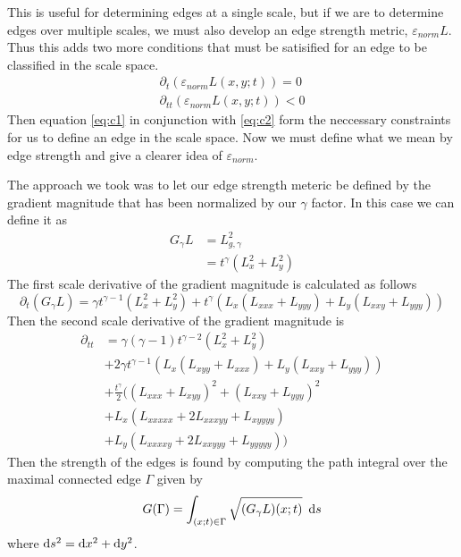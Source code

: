 \documentclass{article}
\begin{document}
This is useful for determining edges at a single scale, but if we are to determine edges over multiple scales, we must also develop an edge strength metric, $\varepsilon_{norm}L$.
Thus this adds two more conditions that must be satisified for an edge to be classified in the scale space. 
\begin{equation} \label{eq:c2}
  \begin{aligned}
    \partial_t(\varepsilon_{norm}L(x,y;t)) = 0\\
    \partial_{tt}(\varepsilon_{norm}L(x,y;t)) < 0
  \end{aligned}
\end{equation}
Then equation \ref{eq:c1} in conjunction with \ref{eq:c2} form the neccessary constraints for us to define an edge in the scale space.
Now we must define what we mean by edge strength and give a clearer idea of $\varepsilon_{norm}$.

The approach we took was to let our edge strength meteric be defined by the gradient magnitude that has been normalized by our $\gamma$ factor.
In this case we can define it as 
\begin{align}
  G_{\gamma}L &= L_{g,\gamma}^2 \\
  &= t^{\gamma}(L_x^2+L_y^2)
\end{align}
The first scale derivative of the gradient magnitude is calculated as follows
\begin{equation}
  \partial_t (G_{\gamma}L) = \gamma t^{\gamma-1}(L_x^2+L_y^2) + t^{\gamma}(L_x(L_{xxx}+L_{yyy})+L_y(L_{xxy} + L_{yyy}))
\end{equation}
Then the second scale derivative of the gradient magnitude is
\begin{equation}
  \begin{aligned}
    \partial_{tt} &= \gamma(\gamma-1)t^{\gamma-2}(L_x^2+L_y^2) \\
     &+ 2\gamma t^{\gamma-1}(L_x(L_{xyy}+L_{xxx})+L_y(L_{xxy}+L_{yyy})) \\
     &+\frac{t^{\gamma}}{2}\big((L_{xxx}+L_{xyy})^2+(L_{xxy}+L_{yyy})^2 \\
     &+ L_x(L_{xxxxx}+2L_{xxxyy}+L_{xyyyy}) \\
     &+L_y(L_{xxxxy}+2L_{xxyyy}+L_{yyyyy})\big)
  \end{aligned}
\end{equation}
Then the strength of the edges is found by computing the path integral over the maximal connected edge $\Gamma$ given by
\begin{equation}
  G(\Gamma) = \int_{(x;t) \in \Gamma} \sqrt{(G_{\gamma}L)(x;t)} \,\, \operatorname{d \!} s
\end{equation}
where $\operatorname{d \!} s^2=\operatorname{d \!} x^2+\operatorname{d \!} y^2$.
\end{document}
